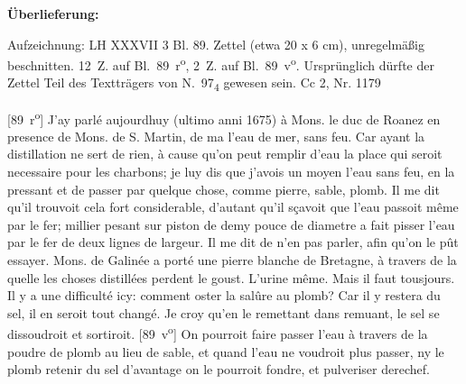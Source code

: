 \begin{ledgroupsized}[r]{120mm}%
\footnotesize%
\pstart%
\noindent%
\textbf{\"{U}berlieferung:}%
\pend%
\end{ledgroupsized}%
\begin{ledgroupsized}[r]{114mm}%
\footnotesize%
\pstart%
\parindent -6mm%
%
Aufzeichnung:
LH XXXVII 3 Bl. 89.
Zettel (etwa 20 x 6 cm), unregelm\"{a}{\ss}ig beschnitten.
12~Z. auf Bl.~89~r\textsuperscript{o}, 2~Z. auf Bl.~89~v\textsuperscript{o}.
Ursprünglich dürfte der Zettel Teil des Textträgers von N.~97\textsubscript{4}
gewesen sein.
\newline%
Cc 2, Nr. 1179%
\pend%
\end{ledgroupsized}%
%
%
\vspace*{8mm}%
\pstart%
\normalsize%
\noindent%
[89~r\textsuperscript{o}] 
J'ay parl\'{e} aujourdhuy (ultimo anni 1675) \`{a} Mons. le duc de Roanez\protect{} en presence de Mons. de S. Martin, de ma  l'eau de mer, sans feu. Car ayant  la distillation\protect{} ne sert de rien, \`{a} cause qu'on peut remplir d'eau la place qui seroit necessaire pour les charbons; je luy dis que j'avois un moyen  l'eau sans feu, en la pressant et  de passer par quelque chose, comme pierre, sable, plomb. Il me dit qu'il trouvoit cela fort considerable, d'autant qu'il s\c{c}avoit que l'eau passoit m\^{e}me par le fer;  millier pesant sur piston de demy pouce de diametre a fait pisser l'eau par le fer de deux lignes de largeur. Il me dit de n'en pas parler, afin qu'on le p\^{u}t essayer.
\pend%
\pstart%
Mons. de Galin\'{e}e\protect{} a port\'{e} une pierre blanche de Bretagne\protect{}, \`{a} travers de la quelle les choses distill\'{e}es\protect{} perdent le goust\protect{}. L'urine\protect{} m\^{e}me. Mais il faut tousjours. Il y a une difficult\'{e} icy: comment oster la sal\^{u}re au \protect{}plomb? Car il y restera du \protect{}sel, il en seroit tout chang\'{e}. Je croy qu'en le remettant dans  remuant, le sel se dissoudroit et sortiroit.
[89~v\textsuperscript{o}]
\pend%
\pstart%
On pourroit faire passer l'eau \`{a} travers de la poudre de plomb au lieu de sable, et quand l'eau ne voudroit plus passer, ny le plomb retenir du sel d'avantage on le pourroit fondre, et pulveriser derechef.
\pend%

